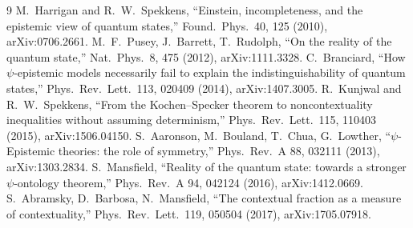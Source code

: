 \documentclass[11pt,a4paper]{article}
\begin{document}
\begin{thebibliography}{9}
 M.~Harrigan and R.~W.~Spekkens, ``Einstein, incompleteness, and the epistemic view of quantum states,'' Found.\ Phys.\ 40, 125 (2010), arXiv:0706.2661.
 M.~F.~Pusey, J.~Barrett, T.~Rudolph, ``On the reality of the quantum state,'' Nat.\ Phys.\ 8, 475 (2012), arXiv:1111.3328.
 C.~Branciard, ``How $\psi$-epistemic models necessarily fail to explain the indistinguishability of quantum states,'' Phys.\ Rev.\ Lett.\ 113, 020409 (2014), arXiv:1407.3005.
 R.~Kunjwal and R.~W.~Spekkens, ``From the Kochen--Specker theorem to noncontextuality inequalities without assuming determinism,'' Phys.\ Rev.\ Lett.\ 115, 110403 (2015), arXiv:1506.04150.
 S.~Aaronson, M.~Bouland, T.~Chua, G.~Lowther, ``$\psi$-Epistemic theories: the role of symmetry,'' Phys.\ Rev.\ A 88, 032111 (2013), arXiv:1303.2834.
 S.~Mansfield, ``Reality of the quantum state: towards a stronger $\psi$-ontology theorem,'' Phys.\ Rev.\ A 94, 042124 (2016), arXiv:1412.0669.
 S.~Abramsky, D.~Barbosa, N.~Mansfield, ``The contextual fraction as a measure of contextuality,'' Phys.\ Rev.\ Lett.\ 119, 050504 (2017), arXiv:1705.07918.
\end{thebibliography}
\end{document}
